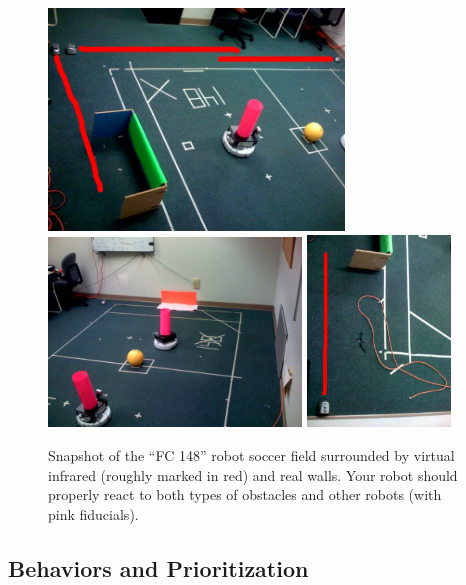 \begin{figure}
\centering
\includegraphics[width=0.7\textwidth]{figures/9_field1a.jpg}
\includegraphics[width=0.6\textwidth]{figures/9_field2.jpg}
\includegraphics[width=0.34\textwidth]{figures/9_field3a.jpg}
\caption{Snapshot of the ``FC 148'' robot soccer field surrounded by virtual infrared (roughly marked in red) and real walls.  Your robot should properly react to both types of obstacles and other robots (with pink fiducials). }
\label{fig:field}
\end{figure}

\subsection{Behaviors and Prioritization}

